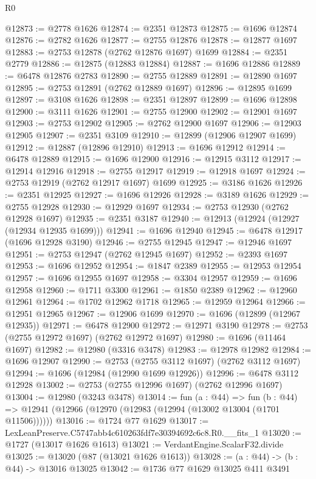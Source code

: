 \begin{lexlean}{R0}
\begin{coremodule}
@12873 := @2778 @1626
@12874 := @2351 @12873
@12875 := @1696 @12874
@12876 := @2782 @1626
@12877 := @2755 @12876
@12878 := @12877 @1697
@12883 := @2753 @12878 (@2762 @12876 @1697) @1699
@12884 := @2351 @2779
@12886 := @12875 (@12883 @12884)
@12887 := @1696 @12886
@12889 := @6478 @12876 @2783
@12890 := @2755 @12889
@12891 := @12890 @1697
@12895 := @2753 @12891 (@2762 @12889 @1697)
@12896 := @12895 @1699
@12897 := @3108 @1626
@12898 := @2351 @12897
@12899 := @1696 @12898
@12900 := @3111 @1626
@12901 := @2755 @12900
@12902 := @12901 @1697
@12903 := @2753 @12902
@12905 := @2762 @12900 @1697
@12906 := @12903 @12905
@12907 := @2351 @3109
@12910 := @12899 (@12906 @12907 @1699)
@12912 := @12887 (@12896 @12910)
@12913 := @1696 @12912
@12914 := @6478 @12889
@12915 := @1696 @12900
@12916 := @12915 @3112
@12917 := @12914 @12916
@12918 := @2755 @12917
@12919 := @12918 @1697
@12924 := @2753 @12919 (@2762 @12917 @1697) @1699
@12925 := @3186 @1626
@12926 := @2351 @12925
@12927 := @1696 @12926
@12928 := @3189 @1626
@12929 := @2755 @12928
@12930 := @12929 @1697
@12934 := @2753 @12930 (@2762 @12928 @1697)
@12935 := @2351 @3187
@12940 := @12913 (@12924 (@12927 (@12934 @12935 @1699)))
@12941 := @1696 @12940
@12945 := @6478 @12917 (@1696 @12928 @3190)
@12946 := @2755 @12945
@12947 := @12946 @1697
@12951 := @2753 @12947 (@2762 @12945 @1697)
@12952 := @2393 @1697
@12953 := @1696 @12952
@12954 := @1847 @2389
@12955 := @12953 @12954
@12957 := @1696 @12955 @1697
@12958 := @3304 @12957
@12959 := @1696 @12958
@12960 := @1711 @3300
@12961 := @1850 @2389
@12962 := @12960 @12961
@12964 := @1702 @12962 @1718
@12965 := @12959 @12964
@12966 := @12951 @12965
@12967 := @12906 @1699
@12970 := @1696 (@12899 (@12967 @12935))
@12971 := @6478 @12900
@12972 := @12971 @3190
@12978 := @2753 (@2755 @12972 @1697) (@2762 @12972 @1697)
@12980 := @1696 (@11464 @1697)
@12982 := @12980 (@3316 @3478)
@12983 := @12978 @12982
@12984 := @1696 @12907
@12990 := @2753 (@2755 @3112 @1697) (@2762 @3112 @1697)
@12994 := @1696 (@12984 (@12990 @1699 @12926))
@12996 := @6478 @3112 @12928
@13002 := @2753 (@2755 @12996 @1697) (@2762 @12996 @1697)
@13004 := @12980 (@3243 @3478)
@13014 := fun (a : @44) =>
  fun (b : @44) => @12941 (@12966 (@12970 (@12983 (@12994 (@13002 @13004 (@1701 @11506))))))
@13016 := @1724 @77 @1629
@13017 := LexLeanPreserve.C5747abb4c610263fdf7e30394692c6c8.R0.__fits_1
@13020 := @1727 (@13017 @1626 @1613)
@13021 := VerdantEngine.ScalarF32.divide
@13025 := @13020 (@87 (@13021 @1626 @1613))
@13028 := (a : @44) -> (b : @44) -> @13016 @13025
@13042 := @1736
    @77
    @1629
    @13025
    @411
    @3491

\end{coremodule}
\end{lexlean}
